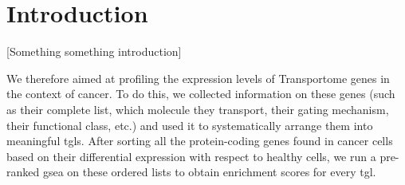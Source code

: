\section{Introduction}

[Something something introduction]

We therefore aimed at profiling the expression levels of Transportome genes in
the context of cancer. To do this, we collected information on these genes (such
as their complete list, which molecule they transport, their gating mechanism,
their functional class, etc.) and used it to systematically arrange them into
meaningful \glspl{tgl}. After sorting all the protein-coding genes found in
cancer cells based on their differential expression with respect to healthy
cells, we run a pre-ranked \gls{gsea} on these ordered lists to obtain
enrichment scores for every \gls{tgl}.
